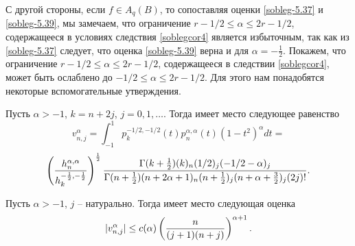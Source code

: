 С другой стороны, если  $f\in A_q(B)$, то сопоставляя оценки \eqref{sobleg-5.37} и \eqref{sobleg-5.39}, мы замечаем, что ограничение $r-1/2\le \alpha\le 2r-1/2$, содержащееся в условиях следствия \ref{soblegcor4} является избыточным, так как из \eqref{sobleg-5.37} следует, что оценка \eqref{sobleg-5.39} верна и для $\alpha=-\frac12$. Покажем, что ограничение $r-1/2\le \alpha\le 2r-1/2$, содержащееся  в следствии \ref{soblegcor4}, может быть ослаблено до $-1/2\le \alpha\le 2r-1/2$. Для этого нам понадобятся некоторые вспомогательные утверждения.

\begin{lemma} Пусть $\alpha>-1$, $k=n+2j$, $j=0,1,\ldots$. Тогда имеет место следующее равенство
$$
v_{n,j}^\alpha=\int_{-1}^1p_k^{-1/2,-1/2}(t)p_n^{\alpha,\alpha}(t)(1-t^2)^\alpha dt=
$$
\begin{equation}\label{sobleg-5.40}
\left(\frac{h_n^{\alpha,\alpha}}{h_k^{-\frac12,-\frac12}}\right)^\frac12
 {\Gamma(k+\frac12)(k)_n(1/2)_j(-1/2-\alpha)_j\over\Gamma(n+\frac12)(n+2\alpha+1)_n
(n+\frac12)_j(n+\alpha+\frac32)_j(2j)!}.
  \end{equation}
\end{lemma}
%

\begin{lemma} Пусть $\alpha>-1$, $j$ -- натурально. Тогда имеет место следующая оценка
$$
|v_{n,j}^\alpha|\le c(\alpha)\left({n\over (j+1)(n+j)}\right)^{\alpha+1}.$$
\end{lemma}

